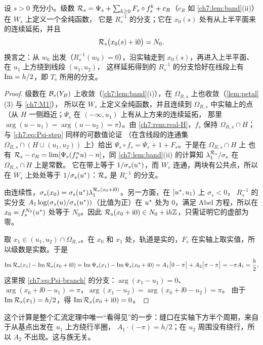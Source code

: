 \begin{lemma}[分支]\label{ch7:lem:branch}
设 $s>0$ 充分小。级数 $\mathcal R_s=\Psi_s+\sum_{k\ge0}F_s\circ f_s^k+c_R$（$c_R$ 如 \cref{ch7:lem:band}(ii)）在 $W_s$ 上定义一个全纯函数，
它是 $R_s^{-1}$ 的分支；它在 $x_0(s)$ 处有从上半平面来的连续延拓，并且
\[
 \mathcal R_s\bigl(x_0(s)+\mathrm{i}0\bigr)=N_0 .
\]
换言之：从 $w_0$ 出发（$R_s^{-1}(w_0)=0$），沿实轴走到 $x_0(s)$，再进入上半平面、在 $u_1$ 上方绕到线段 $(u_1,u_2)$，
这样延拓得到的 $R_s^{-1}$ 的分支恰好在线段上有 $\operatorname{Im}=h/2$，即 $T_s$ 所用的分支。
\end{lemma}

\begin{proof}
级数在 $\mathcal B_s(Y_B)$ 上收敛（\cref{ch7:lem:band}(i)），在 $\Omega_{R,s}$ 上也收敛（\cref{lem:petal}(3) 与 \ref{ch7:M1}），
所以在 $W_s$ 上定义全纯函数，并且连续到 $\Omega_{R,s}$ 中实轴上的点（从 $H$ 一侧趋近；$\Psi_s$ 在 $(-\infty,u_1)$ 上有从上方来的连续延拓，
那里 $\arg(u-u_1)=\arg(u-u_2)=\pi$）。由 \cref{ch7:rem:real-H}，$f_s$ 保持 $\Omega_{R,s}\cap H$；与 \eqref{ch7:eq:Psi-step} 同样的可数值论证
（在含线段的连通集 $\Omega_{R,s}\cap(H\cup(u_1,u_2))$ 上）给出 $\Psi_s\circ f_s=\Psi_s+1+F_s$。于是在 $\Omega_{R,s}\cap H$ 上
也有 $\mathcal R_s-c_R=\lim[\Psi_s(f_s^nu)-n]$，同 \cref{ch7:lem:band}(ii) 的计算知 $\lambda_1^{\mathcal R_s}/\sigma_s$ 在 $\Omega_{R,s}\cap H$ 上是常数。
它在带上等于 $1/\sigma_s(u^{*})$，而 $W_s$ 连通，两块有公共点，所以在 $W_s$ 上处处等于 $1/\sigma_s(u^{*})$：$\mathcal R_s$ 是 $R_s^{-1}$ 的分支。

由连续性，$\sigma_s(x_0)=\sigma_s(u^{*})\lambda_1^{\mathcal R_s(x_0+\mathrm{i}0)}$。另一方面，在 $[u^{*},u_1)$ 上 $\sigma_s<0$，
$R_s^{-1}$ 的实分支 $A_1\log(\sigma_s(u)/\sigma_s(u^{*}))$（比值为正）在 $u^{*}$ 处为 $0$，满足 Abel 方程，所以在
$x_0=f_s^{N_0}(u^{*})$ 处等于 $N_0$。因此 $\mathcal R_s(x_0+\mathrm{i}0)\in N_0+\mathrm{i} h\mathbb{Z}$，只需证明它的虚部为零。

取 $x_1\in(u_1,u_2)\cap\Omega_{R,s}$。在 $x_0$ 和 $x_1$ 处，轨道是实的，$F_s$ 在实轴上取实值，所以级数是实数。于是
\[
 \operatorname{Im}\mathcal R_s(x_1)-\operatorname{Im}\mathcal R_s(x_0+\mathrm{i}0)=\operatorname{Im}\Psi_s(x_1)-\operatorname{Im}\Psi_s(x_0+\mathrm{i}0)
 =A_1\bigl[0-\pi\bigr]+A_2\bigl[\pi-\pi\bigr]=-\pi A_1=\frac h2,
\]
这里按 \eqref{ch7:eq:Psi-branch} 的分支：$\arg(x_1-u_1)=0$、$\arg(x_0+\ii0-u_1)=\pi$，$\arg(x_1-u_2)=\arg(x_0+\ii0-u_2)=\pi$。
由于 $\operatorname{Im}\mathcal R_s(x_1)=h/2$，得 $\operatorname{Im}\mathcal R_s(x_0+\mathrm{i}0)=0$。
\end{proof}

这个计算是整个汇流定理中唯一``看得见''的一步：缝口在实轴下方半个周期，来自于从基点出发在 $u_1$ 上方绕行半圈，
$A_1\cdot(-\pi)=h/2$；在 $u_2$ 周围没有绕行，所以 $A_2$ 不出现。这与族无关。

